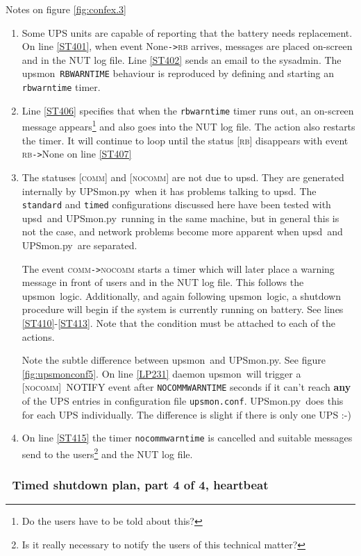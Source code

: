 \documentclass[12pt]{article}
\newlength{\headersep}\setlength{\headersep}{3mm}
\newcommand{\Hsep}{\hspace{\headersep}}
\newcommand{\newcolumn}{\vfill\eject}
\newcommand{\upsd}{\mbox{\textcolor{UPSDCOLOUR}{upsd}}}
\newcommand{\upsmon}{\mbox{\textcolor{MONCOLOUR}{upsmon}}}
\newcommand{\UPSmon}{\mbox{\textcolor{UPSMONCOLOUR}{UPSmon.py}}}
\newcommand{\RB}{\textcolor{UPSDCOLOUR}{\textsc{rb}}}
\newcommand{\NOCOMM}{\textcolor{MONCOLOUR}{\textsc{nocomm}}}
\newcommand{\COMM}{\textcolor{UPSMONCOLOUR}{\textsc{comm}}}
\newcommand{\None}{\textcolor{UPSMONCOLOUR}{\textsf{None}}}
\newcommand{\status}[1]{\textcolor{UPSDCOLOUR}{[{#1}]}}
\newcommand{\NOTev}[1]{\textcolor{MONCOLOUR}{[{#1}]}}
\newcommand{\EVENT}[2]{\textcolor{MONCOLOUR}{#1}{\allowbreak}\texttt{\textcolor{MONCOLOUR}{->}}{\allowbreak}\textcolor{MONCOLOUR}{#2}}
\newcommand{\upsmonconf}{\textcolor{MONCOLOUR}{\texttt{upsmon.conf}}}
\newcommand{\ol}{\begin{enumerate}%
   \setlength{\itemsep}{0em}}
\newcommand{\eol}{\end{enumerate}}
\newcommand{\li}{\item}                 %
\begin{document}
Notes on figure \ref{fig:confex.3}

\ol

\li Some UPS units are capable of reporting that the battery needs
replacement.  On line \ref{ST401}, when event \EVENT{\None}{\RB} arrives,
messages are placed on-screen and in the NUT log file.  Line \ref{ST402} sends
an email to the sysadmin.  The \upsmon\ \texttt{RBWARNTIME} behaviour is
reproduced by defining and starting an \texttt{rbwarntime} timer.

\li Line \ref{ST406} specifies that when the \texttt{rbwarntime} timer runs
out, an on-screen message appears\footnote{Do the users have to be told about
  this?} and also goes into the NUT log file.  The action also restarts the
timer.  It will continue to loop until the status \status{\RB} disappears with
event \EVENT{\RB}{\None} on line \ref{ST407}

\li The statuses \status{\COMM} and \status{\NOCOMM} are not due to \upsd.
They are generated internally by \UPSmon\ when it has problems talking to
\upsd.  The \texttt{standard} and \texttt{timed} configurations discussed here
have been tested with \upsd\ and \UPSmon\ running in the same machine, but in
general this is not the case, and network problems become more apparent when
\upsd\ and \UPSmon\ are separated.

The event \EVENT{\COMM}{\NOCOMM} starts a timer which will later place a
warning message in front of users and in the NUT log file.  This follows the
\upsmon\ logic.  Additionally, and again following \upsmon\ logic, a shutdown
procedure will begin if the system is currently running on battery.  See lines
\ref{ST410}-\ref{ST413}.  Note that the condition must be attached to each of
the actions.

Note the subtle difference between \upsmon\ and \UPSmon. See figure
\ref{fig:upsmonconf5}.  On line \ref{LP231} daemon \upsmon\ will trigger a
\NOTev{\NOCOMM}\ NOTIFY event after \texttt{NOCOMMWARNTIME} seconds if it
can't reach \textbf{any} of the UPS entries in configuration file \upsmonconf.
\UPSmon\ does this for each UPS individually.  The difference is slight if
there is only one UPS :-)

\li On line \ref{ST415} the timer \texttt{nocommwarntime} is cancelled and
suitable messages send to the users\footnote{Is it really necessary to notify
  the users of this technical matter?} and the NUT log file.

\eol

\newcolumn
\subsubsection{\Hsep\ Timed shutdown plan, part 4 of 4, heartbeat}\label{section:confex.4}
\end{document}
